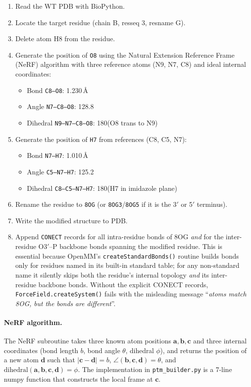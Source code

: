 \documentclass[11pt,a4paper]{article}
\begin{document}
\begin{enumerate}[leftmargin=*]
\item Read the WT PDB with BioPython.
\item Locate the target residue (chain B, resseq 3, resname G).
\item Delete atom H8 from the residue.
\item Generate the position of \texttt{O8} using the Natural Extension
Reference Frame (NeRF) algorithm with three reference atoms (N9, N7, C8)
and ideal internal coordinates:
\begin{itemize}[leftmargin=*]
\item Bond \texttt{C8--O8}: 1.230\,\si{\angstrom}
\item Angle \texttt{N7--C8--O8}: 128.8\textdegree
\item Dihedral \texttt{N9--N7--C8--O8}: 180\textdegree (O8 trans to N9)
\end{itemize}
\item Generate the position of \texttt{H7} from references (C8, C5, N7):
\begin{itemize}[leftmargin=*]
\item Bond \texttt{N7--H7}: 1.010\,\si{\angstrom}
\item Angle \texttt{C5--N7--H7}: 125.2\textdegree
\item Dihedral \texttt{C8--C5--N7--H7}: 180\textdegree (H7 in imidazole plane)
\end{itemize}
\item Rename the residue to \texttt{8OG} (or \texttt{8OG3}/\texttt{8OG5}
if it is the 3$'$ or 5$'$ terminus).
\item Write the modified structure to PDB.
\item Append \texttt{CONECT} records for all intra-residue bonds of 8OG
\emph{and} for the inter-residue O3$'$--P backbone bonds spanning the
modified residue. This is essential because OpenMM's
\texttt{createStandardBonds()} routine builds bonds only for residues
named in its built-in standard table; for any non-standard name it
silently skips both the residue's internal topology \emph{and} its
inter-residue backbone bonds. Without the explicit CONECT records,
\texttt{ForceField.createSystem()} fails with the misleading message
``\emph{atoms match 8OG, but the bonds are different}''.
\end{enumerate}

\paragraph{NeRF algorithm.}
The NeRF subroutine takes three known atom positions $\mathbf{a},
\mathbf{b}, \mathbf{c}$ and three internal coordinates (bond length $b$,
bond angle $\theta$, dihedral $\phi$), and returns the position of a
new atom $\mathbf{d}$ such that
$|\mathbf{c}-\mathbf{d}| = b$,
$\angle(\mathbf{b}, \mathbf{c}, \mathbf{d}) = \theta$, and
$\text{dihedral}(\mathbf{a}, \mathbf{b}, \mathbf{c}, \mathbf{d}) = \phi$.
The implementation in \texttt{ptm\_builder.py} is a 7-line numpy
function that constructs the local frame at $\mathbf{c}$.
\end{document}
